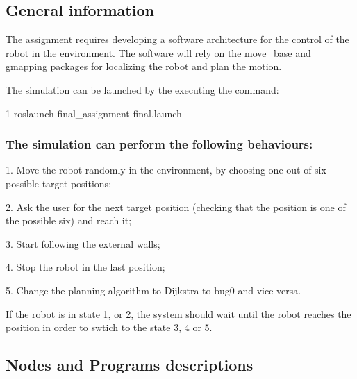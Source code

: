 \subsection*{General information}

The assignment requires developing a software architecture for the control of the robot in the environment. The software will rely on the move\+\_\+base and gmapping packages for localizing the robot and plan the motion.

The simulation can be launched by the executing the command\+:


\begin{DoxyCode}
1 roslaunch final\_assignment final.launch
\end{DoxyCode}


\subsubsection*{The simulation can perform the following behaviours\+:}


\begin{DoxyItemize}
\item 1. Move the robot randomly in the environment, by choosing one out of six possible target positions;
\item 2. Ask the user for the next target position (checking that the position is one of the possible six) and reach it;
\item 3. Start following the external walls;
\item 4. Stop the robot in the last position;
\item 5. Change the planning algorithm to Dijkstra to bug0 and vice versa.
\end{DoxyItemize}

If the robot is in state 1, or 2, the system should wait until the robot reaches the position in order to swtich to the state 3, 4 or 5.

\subsection*{Nodes and Programs descriptions}

